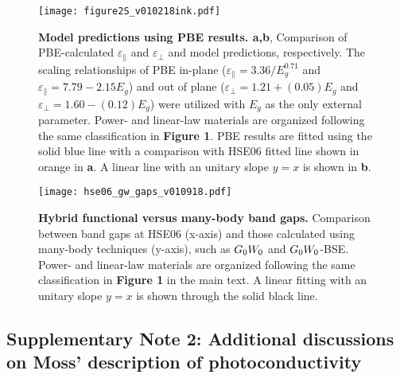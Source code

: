 \documentclass[journal=ancac3,manuscript=article,email=true,hyperref=true,keywords=true]{achemso}
\begin{document}
\pagebreak{}




\begin{figure}[H]
\centering
\texttt{[image: figure2S\_v010218ink.pdf]}
\caption{\label{fig-S4}
{\bf Model predictions using PBE results. a,b}, Comparison of PBE-calculated \(\varepsilon_{\parallel}\) and \(\varepsilon_{\perp}\) 
and model predictions, respectively. The scaling relationships of PBE in-plane ($\varepsilon_{\parallel}=3.36/E_{g}^{0.71}$ and $\varepsilon_{\parallel}=7.79-2.15E_{g}$) 
and out of plane ($\varepsilon_{\perp}=1.21+(0.05)E_{g}$ 
and $\varepsilon_{\perp}=1.60-(0.12)E_{g}$) were utilized 
with $E_{g}$ as the only external parameter. Power- and linear-law materials are organized following 
the same classification in {\bf Figure 1}. PBE results are fitted using the solid blue line with a comparison with HSE06 fitted line shown in orange in {\bf a}. A linear line with an unitary slope $y=x$ is shown in {\bf b}. 
}
\end{figure}

\begin{figure}[H]
\centering
\texttt{[image: hse06\_gw\_gaps\_v010918.pdf]}
\caption{\label{fig-S4a}
{\bf Hybrid functional versus many-body band gaps.} Comparison between band gaps at HSE06 (x-axis) and those calculated using many-body techniques (y-axis), such as $G_{\rm 0}W_{\rm 0}$ and $G_{\rm 0}W_{\rm 0}$-BSE. 
Power- and linear-law materials are organized following 
the same classification in {\bf Figure 1} in the main text. 
A linear fitting with an unitary slope $y=x$ is shown through the solid black line.}
\end{figure}




\pagebreak{}


\subsection*{Supplementary Note 2: Additional discussions on Moss' description of photoconductivity}
\end{document}
